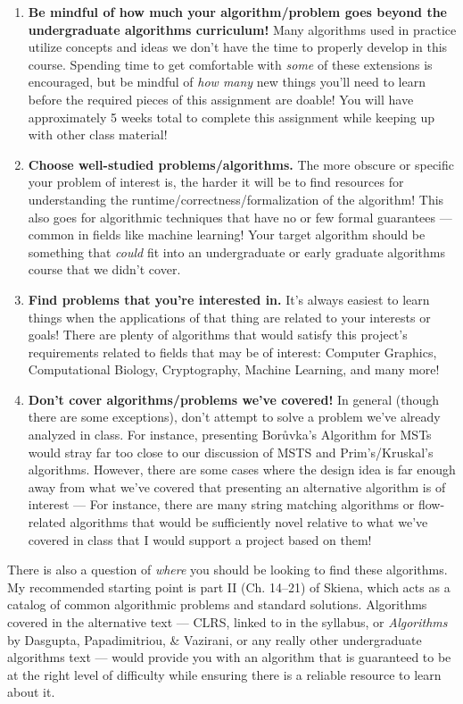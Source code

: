 \documentclass{article}
\begin{document}
\begin{enumerate}
    \item \textbf{Be mindful of how much your algorithm/problem goes beyond the undergraduate algorithms curriculum!} Many algorithms used in practice utilize concepts and ideas we don't have the time to properly develop in this course. Spending time to get comfortable with \textit{some} of these extensions is encouraged, but be mindful of \textit{how many} new things you'll need to learn before the required pieces of this assignment are doable! You will have approximately 5 weeks total to complete this assignment while keeping up with other class material!

    \item \textbf{Choose well-studied problems/algorithms.} The more obscure or specific your problem of interest is, the harder it will be to find resources for understanding the runtime/correctness/formalization of the algorithm! This also goes for algorithmic techniques that have no or few formal guarantees --- common in fields like machine learning! Your target algorithm should be something that \textit{could} fit into an undergraduate or early graduate algorithms course that we didn't cover.

    \item \textbf{Find problems that you're interested in.} It's always easiest to learn things when the applications of that thing are related to your interests or goals! There are plenty of algorithms that would satisfy this project's requirements related to fields that may be of interest: Computer Graphics, Computational Biology, Cryptography, Machine Learning, and many more! 

    \item \textbf{Don't cover algorithms/problems we've covered!} In general (though there are some exceptions), don't attempt to solve a problem we've already analyzed in class. For instance, presenting Borůvka's Algorithm for MSTs would stray far too close to our discussion of MSTS and Prim's/Kruskal's algorithms. However, there are some cases where the design idea is far enough away from what we've covered that presenting an alternative algorithm is of interest --- For instance, there are many string matching algorithms or flow-related algorithms that would be sufficiently novel relative to what we've covered in class that I would support a project based on them!
\end{enumerate}

There is also a question of \textit{where} you should be looking to find these algorithms. My recommended starting point is part II (Ch. 14--21) of Skiena, which acts as a catalog of common algorithmic problems and standard solutions. Algorithms covered in the alternative text --- CLRS, linked to in the syllabus, or \textit{Algorithms} by Dasgupta, Papadimitriou, \& Vazirani, or any really other undergraduate algorithms text --- would provide you with an algorithm that is guaranteed to be at the right level of difficulty while ensuring there is a reliable resource to learn about it. 
\end{document}
